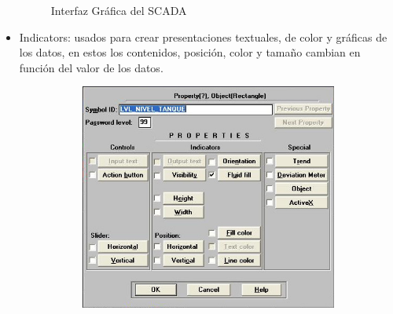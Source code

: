 \begin{itemize}
\begin{figure}[!ht]
\begin{subfigure}[b]{0.2\textwidth}
	    \caption{}
	    \label{}
  	\end{subfigure}
	\caption{Interfaz Gráfica del SCADA}
	\label{fig:controlshmi}
  \end{figure}
	
	
\item Indicators: usados para crear presentaciones textuales, de color
	y gráficas de los datos, en estos los contenidos, posición, color y
	tamaño cambian en función del valor de los datos.
  \begin{figure}[!ht]
	\centering
	\begin{subfigure}[b]{0.2\textwidth}
	   \includegraphics[width=\textwidth]{Cap5-SCADA/images/indicator.jpeg}
	    \caption{}
	    \label{}
  	\end{subfigure}
	\begin{subfigure}[b]{0.2\textwidth}

\end{subfigure}
\end{figure}
\end{itemize}
